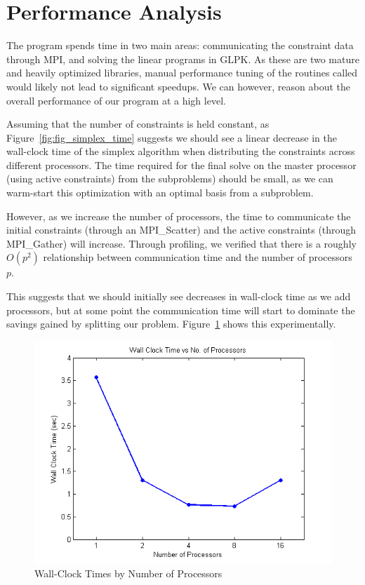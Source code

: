 \documentclass[12pt]{article}
\begin{document}
\section*{Performance Analysis}

The program spends time in two main areas: communicating the constraint data through MPI, and solving the linear programs in GLPK.  
As these are two mature and heavily optimized libraries, manual performance tuning of the routines called would likely not lead to significant speedups.
We can however, reason about the overall performance of our program at a high level.

Assuming that the number of constraints is held constant, as Figure~\ref{fig:fig_simplex_time} suggests we should see a linear decrease in the wall-clock time of the simplex algorithm when distributing the constraints across different processors.  
The time required for the final solve on the master processor (using active constraints) from the subproblems) should be small, as we can warm-start this optimization with an optimal basis from a subproblem.

However, as we increase the number of processors, the time to communicate the initial constraints (through an MPI\_Scatter) and the active constraints (through MPI\_Gather) will increase.
Through profiling, we verified that there is a roughly $O(p^2)$ relationship between communication time and the number of processors $p$.

This suggests that we should initially see decreases in wall-clock time as we add processors, but at some point the communication time will start to dominate the savings gained by splitting our problem.  
Figure~\ref{fig:wct_numproc} shows this experimentally.

\begin{figure}[ht]
    \centering
        \includegraphics[scale=0.9]{../plot/figs/wct_numproc.png}
    \caption{Wall-Clock Times by Number of Processors}
    \label{fig:wct_numproc}
\end{figure}
\end{document}
